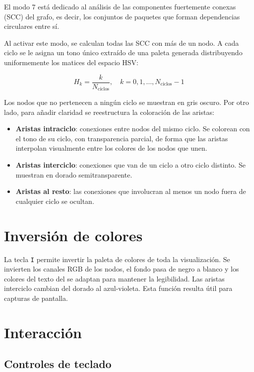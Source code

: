\documentclass[12pt,a4paper]{report}
\begin{document}
	El modo 7 está dedicado al análisis de las componentes fuertemente conexas (SCC) del grafo, es decir, los conjuntos de paquetes que forman dependencias circulares entre sí.
	\newline
	
	Al activar este modo, se calculan todas las SCC con más de un nodo. A cada ciclo se le asigna un tono único extraído de una paleta generada distribuyendo uniformemente los matices del espacio HSV:
	
	\begin{equation}
		H_k = \frac{k}{N_{\text{ciclos}}}, \quad k = 0, 1, \ldots, N_{\text{ciclos}} - 1
	\end{equation}
	
	Los nodos que no pertenecen a ningún ciclo se muestran en gris oscuro. Por otro lado, para añadir claridad se reestructura la coloración de las aristas:	
	\begin{itemize}
		\item \textbf{Aristas intraciclo}: conexiones entre nodos del mismo ciclo. Se colorean con el tono de su ciclo, con transparencia parcial, de forma que las aristas interpolan visualmente entre los colores de los nodos que unen.
		\item \textbf{Aristas interciclo}: conexiones que van de un ciclo a otro ciclo distinto. Se muestran en dorado semitransparente.
		\item \textbf{Aristas al resto}: las conexiones que involucran al menos un nodo fuera de cualquier ciclo se ocultan.
	\end{itemize}
	
	\section{Inversión de colores}
	
	La tecla \texttt{I} permite invertir la paleta de colores de toda la visualización. Se invierten los canales RGB de los nodos, el fondo pasa de negro a blanco y los colores del texto del se adaptan para mantener la legibilidad. Las aristas interciclo cambian del dorado al azul-violeta. Esta función resulta útil para capturas de pantalla.
	
	\section{Interacción}
	
	\subsection{Controles de teclado}
	
\end{document}
